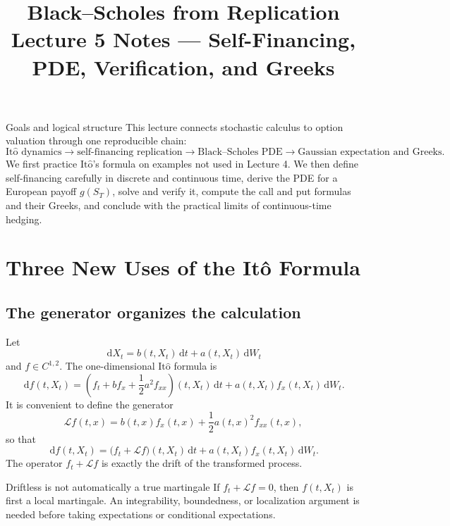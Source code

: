 \documentclass[10pt]{article}
\title{\textbf{Black--Scholes from Replication}\\
\large Lecture 5 Notes --- Self-Financing, PDE, Verification, and Greeks}
\author{}
\date{}
\newcommand{\1}{\mathbf 1}
\newcommand{\dd}{\,\mathrm d}
\newcommand{\Ito}{\mathrm{It\hat{o}}}
\theoremstyle{definition}
\begin{document}
\maketitle
\vspace{-1.4em}

\begin{keyidea}{Goals and logical structure}
This lecture connects stochastic calculus to option valuation through one
reproducible chain:
\[
\text{\(\Ito\) dynamics}
\longrightarrow
\text{self-financing replication}
\longrightarrow
\text{Black--Scholes PDE}
\longrightarrow
\text{Gaussian expectation and Greeks}.
\]
We first practice \(\Ito\)'s formula on examples not used in Lecture 4.
We then define self-financing carefully in discrete and continuous time,
derive the PDE for a European payoff \(g(S_T)\), solve and verify it, compute
the call and put formulas and their Greeks, and conclude with the practical
limits of continuous-time hedging.
\end{keyidea}

\section{Three New Uses of the It\^o Formula}

\subsection{The generator organizes the calculation}

Let
\[
\dd X_t=b(t,X_t)\dd t+a(t,X_t)\dd W_t
\]
and \(f\in C^{1,2}\). The one-dimensional \(\Ito\) formula is
\[
\dd f(t,X_t)
=\left(f_t+bf_x+\frac12a^2f_{xx}\right)(t,X_t)\dd t
+a(t,X_t)f_x(t,X_t)\dd W_t.
\]
It is convenient to define the generator
\[
\mathcal Lf(t,x)
=b(t,x)f_x(t,x)+\frac12a(t,x)^2f_{xx}(t,x),
\]
so that
\[
\boxed{
\dd f(t,X_t)
=\bigl(f_t+\mathcal Lf\bigr)(t,X_t)\dd t
+a(t,X_t)f_x(t,X_t)\dd W_t.}
\]
The operator \(f_t+\mathcal Lf\) is exactly the drift of the transformed
process.

\begin{warningbox}{Driftless is not automatically a true martingale}
If \(f_t+\mathcal Lf=0\), then \(f(t,X_t)\) is first a local martingale.
An integrability, boundedness, or localization argument is needed before
taking expectations or conditional expectations.
\end{warningbox}
\end{document}
